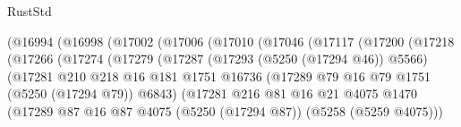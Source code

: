 \begin{lexlean}{RustStd}
\begin{coremodule}
                              (@16994
                                (@16998
                                  (@17002
                                    (@17006
                                      (@17010
                                        (@17046
                                          (@17117
                                            (@17200
                                              (@17218
                                                (@17266
                                                  (@17274
                                                    (@17279
                                                      (@17287
                                                        (@17293 (@5250 (@17294 @46)) @5566)
                                                        (@17281
                                                          @210
                                                          @218
                                                          @16
                                                          @181
                                                          @1751
                                                          @16736
                                                          (@17289
                                                            @79
                                                            @16
                                                            @79
                                                            @1751
                                                            (@5250 (@17294 @79))
                                                            @6843)
                                                          (@17281
                                                            @216
                                                            @81
                                                            @16
                                                            @21
                                                            @4075
                                                            @1470
                                                            (@17289
                                                              @87
                                                              @16
                                                              @87
                                                              @4075
                                                              (@5250 (@17294 @87))
                                                              (@5258 (@5259 @4075)))

\end{coremodule}
\end{lexlean}
